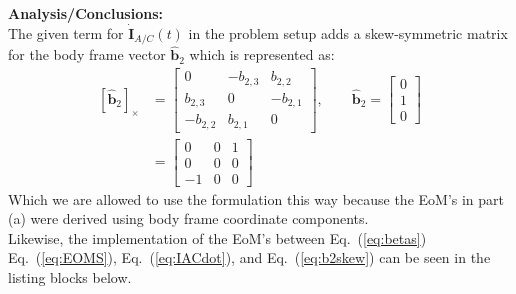 \documentclass[titlepage]{article}
\begin{document}
\textbf{Analysis/Conclusions:}\\

The given term for $\dot{\boldsymbol{I}}_{A/C}(t)$ in the problem setup adds a skew-symmetric matrix for the body frame vector $\hat{\boldsymbol{b}}_2$ which is represented as:
\begin{equation}
	\begin{split}
		\left[\hat{\boldsymbol{b}}_2\right]_\times&=
		\begin{bmatrix}
			0 & -b_{2,3} & b_{2,2} \\
			b_{2,3} & 0 & -b_{2,1} \\
			-b_{2,2} & b_{2,1} & 0
		\end{bmatrix},\qquad\hat{\boldsymbol{b}}_2=\begin{bmatrix}0\\1\\0\end{bmatrix} \\
		&=
		\begin{bmatrix}
			0 & 0 & 1 \\
			0 & 0 & 0 \\
			-1 & 0 & 0
		\end{bmatrix}
	\end{split}
	\label{eq:b2skew}
\end{equation}
Which we are allowed to use the formulation this way because the EoM's in part (a) were derived using body frame coordinate components.\\

Likewise, the implementation of the EoM's between Eq.~(\ref{eq:betas}) Eq.~(\ref{eq:EOMS}), Eq.~(\ref{eq:IACdot}), and Eq.~(\ref{eq:b2skew}) can be seen in the listing blocks below.\\
\end{document}
